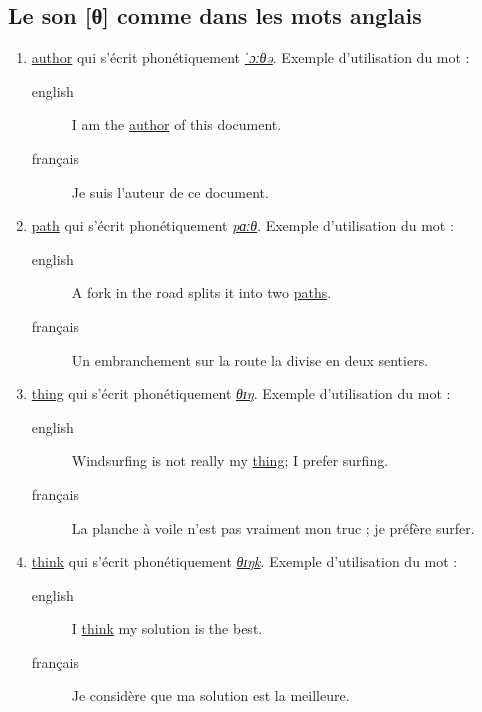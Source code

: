 \subsection{Le son [θ] comme dans les mots anglais}
\label{sec:org4f7f160}
\begin{enumerate}
\item \href{http://www.wordreference.com/enfr/author}{author} qui s'écrit phonétiquement \href{https://en.oxforddictionaries.com/definition/author}{\emph{ˈɔːθə}}. Exemple d'utilisation du mot :
\begin{description}
\item[{english}] \textenglish{I am the \href{https://youtu.be/lyGivD8aJi4}{author} of this document.}
\item[{français}] Je suis l'auteur de ce document.
\end{description}
\item \href{http://www.wordreference.com/enfr/path}{path} qui s'écrit phonétiquement \href{https://en.oxforddictionaries.com/definition/path}{\emph{pɑːθ}}. Exemple d'utilisation du mot :
\begin{description}
\item[{english}] \textenglish{A fork in the road splits it into two \href{https://youtu.be/EZdFE-nnyyQ}{paths}.}
\item[{français}] Un embranchement sur la route la divise en deux
sentiers.
\end{description}
\item \href{http://www.wordreference.com/enfr/thing}{thing} qui s'écrit phonétiquement \href{https://en.oxforddictionaries.com/definition/thing}{\emph{θɪŋ}}. Exemple d'utilisation du mot :
\begin{description}
\item[{english}] \textenglish{Windsurfing is not really my \href{https://youtu.be/h-pmsrw8XNE}{thing}; I prefer surfing.}
\item[{français}] La planche à voile n'est pas vraiment mon truc ; je
préfère surfer.
\end{description}
\item \href{http://www.wordreference.com/enfr/think}{think} qui s'écrit phonétiquement \href{https://en.oxforddictionaries.com/definition/think}{\emph{θɪŋk}}. Exemple d'utilisation du mot :
\begin{description}
\item[{english}] \textenglish{I \href{https://youtu.be/PpD8OvMTRiE}{think} my solution is the best.}
\item[{français}] Je considère que ma solution est la meilleure.
\end{description}
\end{enumerate}
